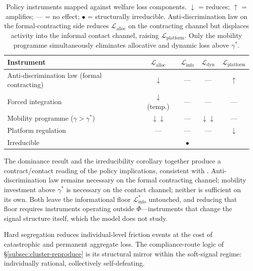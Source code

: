 \documentclass[12pt,a4paper]{article}
\theoremstyle{definition}
\numberwithin{proposition}{subsection}
\begin{document}
\begin{table}[t]
\centering
\renewcommand{\arraystretch}{1.4}
\small
\begin{tabular}{lcccc}
\toprule
\textbf{Instrument} &
$\mathcal{L}_{\text{alloc}}$ &
$\mathcal{L}_{\text{info}}$ &
$\mathcal{L}_{\text{dyn}}$ &
$\mathcal{L}_{\text{platform}}$ \\
\midrule
Anti-discrimination law (formal contracting)
                          & $\downarrow$ & --- & --- & $\uparrow$ \\
Forced integration        & $\downarrow$ (temp.) & --- & --- & --- \\
Mobility programme ($\gamma > \gamma^*$) & $\downarrow\downarrow$ & --- & $\downarrow\downarrow$ & --- \\
Platform regulation       & --- & --- & --- & $\downarrow$ \\
\midrule
Irreducible               & & $\bullet$ & & \\
\bottomrule
\end{tabular}
\caption{Policy instruments mapped against welfare loss components.
$\downarrow$ = reduces; $\uparrow$ = amplifies; --- = no effect;
$\bullet$ = structurally irreducible. Anti-discrimination law on
the formal-contracting side reduces $\mathcal{L}_{\text{alloc}}$
on the contracting channel but displaces activity into the
informal contact channel, raising $\mathcal{L}_{\text{platform}}$.
Only the mobility programme simultaneously eliminates allocative
and dynamic loss above $\gamma^*$.}
\label{tab:welfare}
\end{table}

The dominance result and the irreducibility corollary together
produce a contract/contact reading of the policy implications,
consistent with \citet{Loury2002}. Anti-discrimination law remains
necessary on the formal contracting channel; mobility investment
above $\gamma^*$ is necessary on the contact channel; neither is
sufficient on its own. Both leave the informational floor
$\mathcal{L}_{\text{info}}^*$ untouched, and reducing that floor
requires instruments operating outside $\Phi$---instruments that
change the signal structure itself, which the model does not study.

Hard segregation reduces individual-level friction events at the
cost of catastrophic and permanent aggregate loss. The
compliance-route logic of \S\ref{subsec:cluster-reproduce} is its
structural mirror within the soft-signal regime: individually
rational, collectively self-defeating.
\end{document}
